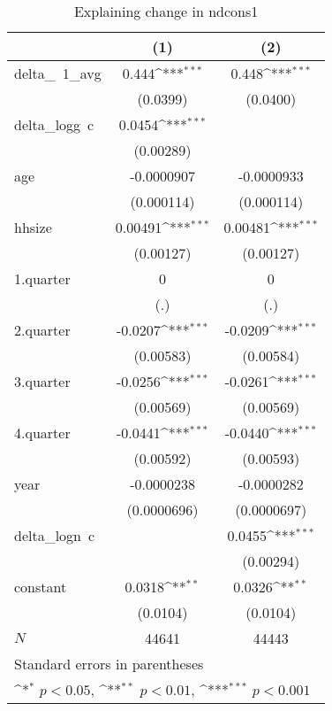 \begin{table}[htbp]\centering
\def\sym#1{\ifmmode^{#1}\else\(^{#1}\)\fi}
\caption{\label{logndcons1\_deltacons} Explaining change in ndcons1}
\begin{tabular}{l*{2}{c}}
\hline\hline
            &\multicolumn{1}{c}{(1)}         &\multicolumn{1}{c}{(2)}         \\
\hline
delta\_~1\_avg&       0.444\sym{***}&       0.448\sym{***}\\
            &    (0.0399)         &    (0.0400)         \\
delta\_logg~c&      0.0454\sym{***}&                     \\
            &   (0.00289)         &                     \\
age         &  -0.0000907         &  -0.0000933         \\
            &  (0.000114)         &  (0.000114)         \\
hhsize      &     0.00491\sym{***}&     0.00481\sym{***}\\
            &   (0.00127)         &   (0.00127)         \\
1.quarter   &           0         &           0         \\
            &         (.)         &         (.)         \\
2.quarter   &     -0.0207\sym{***}&     -0.0209\sym{***}\\
            &   (0.00583)         &   (0.00584)         \\
3.quarter   &     -0.0256\sym{***}&     -0.0261\sym{***}\\
            &   (0.00569)         &   (0.00569)         \\
4.quarter   &     -0.0441\sym{***}&     -0.0440\sym{***}\\
            &   (0.00592)         &   (0.00593)         \\
year        &  -0.0000238         &  -0.0000282         \\
            & (0.0000696)         & (0.0000697)         \\
delta\_logn~c&                     &      0.0455\sym{***}\\
            &                     &   (0.00294)         \\
constant    &      0.0318\sym{**} &      0.0326\sym{**} \\
            &    (0.0104)         &    (0.0104)         \\
\hline
\(N\)       &       44641         &       44443         \\
\hline\hline
\multicolumn{3}{l}{\footnotesize Standard errors in parentheses}\\
\multicolumn{3}{l}{\footnotesize \sym{*} \(p<0.05\), \sym{**} \(p<0.01\), \sym{***} \(p<0.001\)}\\
\end{tabular}
\end{table}
